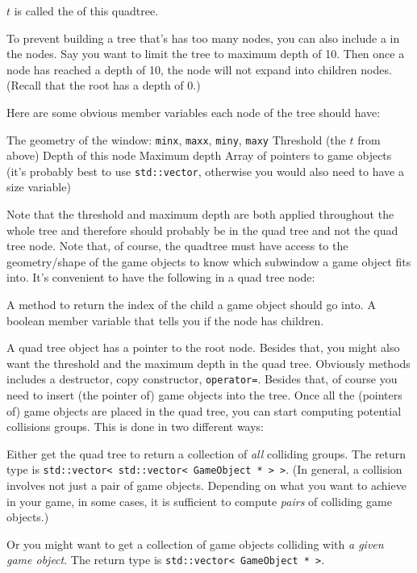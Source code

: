 $t$ is called the  of this quadtree.

To prevent building a tree that's has too many nodes,
you can also include a  in the nodes.
Say you want to limit the tree to maximum depth of 10.
Then once a node has reached a depth of 10, the node will not
expand into children nodes.
(Recall that the root has a depth of 0.)

Here are some obvious member variables each node of the tree should
have:
\begin{myenum}
  \li The geometry of the window: \verb!minx!, \verb!maxx!, \verb!miny!, \verb!maxy!
  \li Threshold (the $t$ from above)
  \li Depth of this node
  \li Maximum depth
  \li Array of pointers to game objects (it's probably best to use
  \verb!std::vector!, otherwise you would also need to have a
  size variable)
\end{myenum}
Note that the threshold and maximum depth are both applied throughout the
whole tree and therefore should probably be in the quad tree and not the quad
tree node.
Note that, of course, the quadtree must have access to the geometry/shape
of the game objects to know which subwindow a game object fits into.
It's convenient to have the following in a quad tree node:
\begin{myenum}
  \li A method to return the index of the child a game object should go into.
  \li A boolean member variable that tells you if the node has children.
\end{myenum}

A quad tree object has a pointer to the root node.
Besides that, you might also want the threshold and the maximum depth
in the quad tree.
Obviously methods includes a destructor, copy constructor, \verb!operator=!.
Besides that, of course you need to insert
(the pointer of) game objects into the tree.
Once all the (pointers of) game objects are placed in the quad tree,
you can start computing potential collisions groups.
This is done in two different ways:
\begin{itemize}
  \li Either get the quad tree to return
  a collection of \textit{all} colliding groups.
  The return type is \texttt{std::vector< std::vector< GameObject * > >}.
  (In general, a collision involves not just a pair of game objects.
  Depending on what you want to achieve in your game,
  in some cases, it is sufficient to compute \textit{pairs} of
  colliding game objects.)

  \li Or you might want to get 
  a collection of game objects colliding with \textit{a given
  game object}.
  The return type is \texttt{std::vector< GameObject * >}.
\end{itemize}

